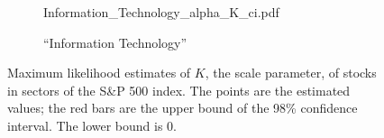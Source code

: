 \documentclass{article}
\begin{document}
\begin{figure}[htb!]
\begin{subfigure}[b]{0.45\linewidth}
                    {Information_Technology_alpha_K_ci.pdf}
                    \caption{``Information Technology''}
                    \label{fig:Information_Technology_alpha_K_ci}
  \end{subfigure}
  \caption{\small Maximum likelihood estimates of $K$, the scale
    parameter, of stocks in sectors of the S\&P 500 index. The points
    are the
    estimated values; the red bars are the upper bound of the 98\%
    confidence interval. The lower bound is 0.
  }
\end{figure}




\end{document}
